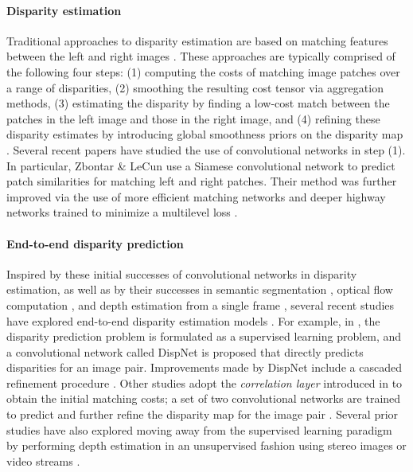 \documentclass[letterpaper, 10 pt, conference]{ieeeconf}
\begin{document}
\paragraph{\textbf{Disparity estimation}} Traditional approaches to disparity estimation are based on matching features between the left and right images \cite{barnard1982computational,scharstein2002taxonomy}. These approaches are typically comprised of the following four steps: (1) computing the costs of matching image patches over a range of disparities, (2) smoothing the resulting cost tensor via aggregation methods, (3) estimating the disparity by finding a low-cost match between the patches in the left image and those in the right image, and (4) refining these disparity estimates by introducing global smoothness priors on the disparity map \cite{scharstein2002taxonomy,hosni2013,hirschmuller2009,hu2012stereo}. Several recent papers have studied the use of convolutional networks in step (1). In particular, Zbontar \& LeCun \cite{zbontar2016stereo} use a Siamese convolutional network to predict patch similarities for matching left and right patches. Their method was further improved via the use of more efficient matching networks \cite{luo2016efficient} and deeper highway networks trained to minimize a multilevel loss \cite{shaked2017improved}.

\paragraph{\textbf{End-to-end disparity prediction}} Inspired by these initial successes of convolutional networks in disparity estimation, as well as by their successes in semantic segmentation \cite{long2015fully}, optical flow computation \cite{fischer2015flownet,ilg2017flownet}, and depth estimation from a single frame \cite{eigen2015single}, several recent studies have explored end-to-end disparity estimation models \cite{mayer2016large,kendall2017end,liang2017learning,pang2017cascade}. For example, in \cite{mayer2016large}, the disparity prediction problem is formulated as a supervised learning problem, and a convolutional network called DispNet is proposed that directly predicts disparities for an image pair. Improvements made by DispNet include a cascaded refinement procedure \cite{pang2017cascade}. Other studies adopt the \emph{correlation layer} introduced in \cite{fischer2015flownet} to obtain the initial matching costs; a set of two convolutional networks are trained to predict and further refine the disparity map for the image pair \cite{liang2017learning}. Several prior studies have also explored moving away from the supervised learning paradigm by performing depth estimation in an unsupervised fashion using stereo images \cite{godard2017unsupervised} or video streams \cite{zhou2017unsupervised}.
\end{document}
